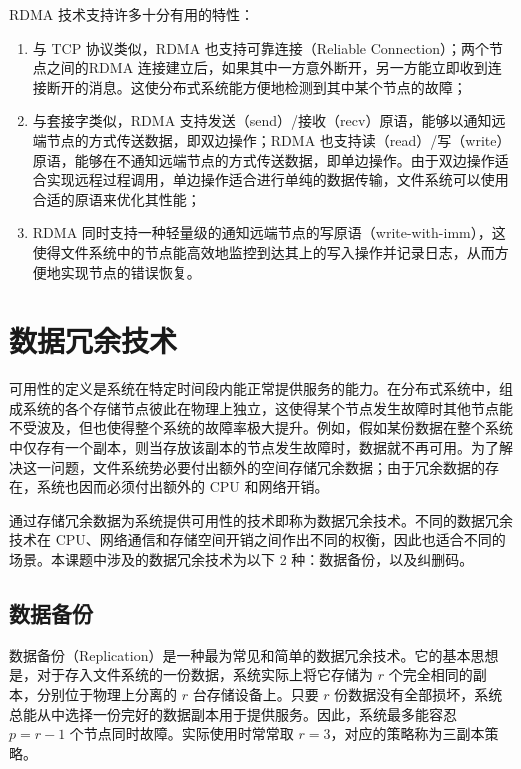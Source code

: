 RDMA 技术支持许多十分有用的特性：

\begin{enumerate}[(1)]

    \item 与 TCP 协议类似，RDMA 也支持可靠连接（Reliable Connection）；两个节点之间的RDMA 连接建立后，如果其中一方意外断开，另一方能立即收到连接断开的消息。这使分布式系统能方便地检测到其中某个节点的故障；
    \item 与套接字类似，RDMA 支持发送（send）/接收（recv）原语，能够以通知远端节点的方式传送数据，即双边操作；RDMA 也支持读（read）/写（write）原语，能够在不通知远端节点的方式传送数据，即单边操作。由于双边操作适合实现远程过程调用，单边操作适合进行单纯的数据传输，文件系统可以使用合适的原语来优化其性能；
    \item RDMA 同时支持一种轻量级的通知远端节点的写原语（write-with-imm），这使得文件系统中的节点能高效地监控到达其上的写入操作并记录日志，从而方便地实现节点的错误恢复。

\end{enumerate}

\section{数据冗余技术}
\label{sec:ch2_avail}

可用性的定义是系统在特定时间段内能正常提供服务的能力。在分布式系统中，组成系统的各个存储节点彼此在物理上独立，这使得某个节点发生故障时其他节点能不受波及，但也使得整个系统的故障率极大提升。例如，假如某份数据在整个系统中仅存有一个副本，则当存放该副本的节点发生故障时，数据就不再可用。为了解决这一问题，文件系统势必要付出额外的空间存储冗余数据；由于冗余数据的存在，系统也因而必须付出额外的 CPU 和网络开销。

通过存储冗余数据为系统提供可用性的技术即称为数据冗余技术。不同的数据冗余技术在 CPU、网络通信和存储空间开销之间作出不同的权衡，因此也适合不同的场景。本课题中涉及的数据冗余技术为以下 2 种：数据备份，以及纠删码。

\subsection{数据备份}
\label{subsec:ch2_avail_repli}

数据备份（Replication）是一种最为常见和简单的数据冗余技术。它的基本思想是，对于存入文件系统的一份数据，系统实际上将它存储为 $r$ 个完全相同的副本，分别位于物理上分离的 $r$ 台存储设备上。只要 $r$ 份数据没有全部损坏，系统总能从中选择一份完好的数据副本用于提供服务。因此，系统最多能容忍 $p = r - 1$ 个节点同时故障。实际使用时常常取 $r = 3$，对应的策略称为三副本策略。

